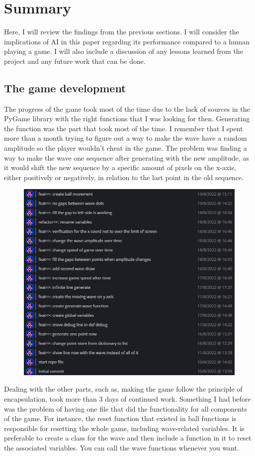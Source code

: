 \chapter{Summary}
Here, I will review the findings from the previous sections. I will consider the implications of AI in this paper regarding its performance compared to a human playing a game. I will also include a discussion of any lessons learned from the project and any future work that can be done.

\section{The game development}
The progress of the game took most of the time due to the lack of sources in the PyGame library with the right functions that I was looking for then. Generating the function was the part that took most of the time. I remember that I spent more than a month trying to figure out a way to make the wave have a random amplitude so the player wouldn't cheat in the game. The problem was finding a way to make the wave one sequence after generating with the new amplitude, as it would shift the new sequence by a specific amount of pixels on the x-axis, either positively or negatively, in relation to the last point in the old sequence.
\begin{figure}[H]
	\centering
	\includegraphics[width=0.7\linewidth]{usedImages/repoStart}
	\caption[the start of game repository on GitHub]{}
	\label{fig:repostart}
\end{figure}

Dealing with the other parts, such as, making the game follow the principle of encapsulation, took more than 3 days of continued work. Something I had before was the problem of having one file that did the functionality for all components of the game. For instance, the reset function that existed in ball functions is responsible for resetting the whole game, including wave-related variables. It is preferable to create a class for the wave and then include a function in it to reset the associated variables. You can call the wave functions whenever you want.

